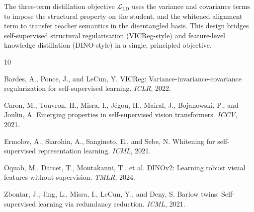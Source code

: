 \documentclass[11pt,a4paper]{article}
\newcommand{\calL}{\mathcal{L}}
\begin{document}
The three-term distillation objective $\calL_{\mathrm{LD}}$ uses the variance
and covariance terms to impose the structural property on the student, and the
whitened alignment term to transfer teacher semantics in the disentangled basis.
This design bridges self-supervised structural regularisation (VICReg-style) and
feature-level knowledge distillation (DINO-style) in a single, principled
objective.


\begin{thebibliography}{10}

Bardes, A., Ponce, J., and LeCun, Y.
\newblock VICReg: Variance-invariance-covariance regularization for
  self-supervised learning.
\newblock \emph{ICLR}, 2022.

Caron, M., Touvron, H., Misra, I., J\'{e}gou, H., Mairal, J., Bojanowski, P., and Joulin, A.
\newblock Emerging properties in self-supervised vision transformers.
\newblock \emph{ICCV}, 2021.

Ermolov, A., Siarohin, A., Sangineto, E., and Sebe, N.
\newblock Whitening for self-supervised representation learning.
\newblock \emph{ICML}, 2021.

Oquab, M., Darcet, T., Moutakanni, T., et al.
\newblock DINOv2: Learning robust visual features without supervision.
\newblock \emph{TMLR}, 2024.

Zbontar, J., Jing, L., Misra, I., LeCun, Y., and Deny, S.
\newblock Barlow twins: Self-supervised learning via redundancy reduction.
\newblock \emph{ICML}, 2021.

\end{thebibliography}
\end{document}
